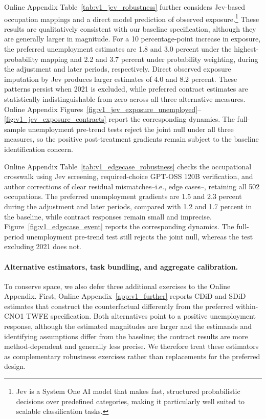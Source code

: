 Online Appendix Table~\ref{tab:v1_jev_robustness} further considers Jev-based occupation mappings and a direct model prediction of observed exposure.\footnote{Jev is a System One AI model that makes fast, structured probabilistic decisions over predefined categories, making it particularly well suited to scalable classification tasks.} These results are qualitatively consistent with our baseline specification, although they are generally larger in magnitude. For a 10 percentage-point increase in exposure, the preferred unemployment estimates are 1.8 and 3.0 percent under the highest-probability mapping and 2.2 and 3.7 percent under probability weighting, during the adjustment and later periods, respectively. Direct observed exposure imputation by Jev produces larger estimates of 4.0 and 8.2 percent. These patterns persist when 2021 is excluded, while preferred contract estimates are statistically indistinguishable from zero across all three alternative measures. Online Appendix Figures~\ref{fig:v1_jev_exposure_unemployed}--\ref{fig:v1_jev_exposure_contracts} report the corresponding dynamics. The full-sample unemployment pre-trend tests reject the joint null under all three measures, so the positive post-treatment gradients remain subject to the baseline identification concern.

\FloatBarrier
Online Appendix Table~\ref{tab:v1_edgecase_robustness} checks the occupational crosswalk using Jev screening, required-choice GPT-OSS 120B verification, and author corrections of clear residual mismatches--i.e., edge cases--, retaining all 502 occupations. The preferred unemployment gradients are 1.5 and 2.3 percent during the adjustment and later periods, compared with 1.2 and 1.7 percent in the baseline, while contract responses remain small and imprecise. Figure~\ref{fig:v1_edgecase_event} reports the corresponding dynamics. The full-period unemployment pre-trend test still rejects the joint null, whereas the test excluding 2021 does not.

\paragraph{Alternative estimators, task bundling, and aggregate calibration.} To conserve space, we also defer three additional exercises to the Online Appendix. First, Online Appendix~\ref{app:v1_further} reports CDiD and SDiD estimates that construct the counterfactual differently from the preferred within-CNO1 TWFE specification. Both alternatives point to a positive unemployment response, although the estimated magnitudes are larger and the estimands and identifying assumptions differ from the baseline; the contract results are more method-dependent and generally less precise. We therefore treat these estimators as complementary robustness exercises rather than replacements for the preferred design.

